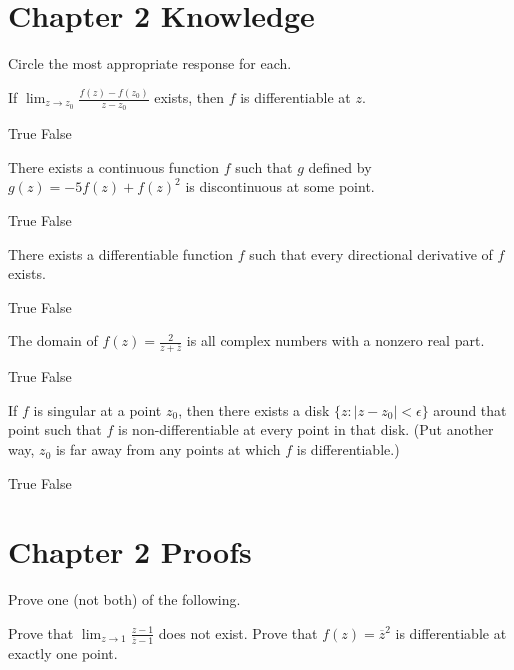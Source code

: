 \documentclass[13pt]{exam}
\begin{document}
\section*{Chapter 2 Knowledge}

Circle the most appropriate response for each.

\begin{questions}

\setcounter{question}{5}

\question If \(\lim_{z\to z_0}\frac{f(z)-f(z_0)}{z-z_0}\) exists,
then \(f\) is differentiable at \(z\). 
\begin{choices}
\choice True
\choice False
\end{choices}

\question There exists a continuous function \(f\) such that \(g\) defined by 
\(g(z)=-5f(z)+f(z)^2\) is discontinuous at some point. 
\begin{choices}
\choice True
\choice False
\end{choices}

\question There exists a differentiable function \(f\) such that
every directional derivative of \(f\) exists.
\begin{choices}
\choice True
\choice False
\end{choices}

\question The domain of \(f(z)=\frac{2}{z+\overline{z}}\) is all complex numbers
with a nonzero real part. 
\begin{choices}
\choice True
\choice False
\end{choices}

\question If \(f\) is singular at a point \(z_0\), then there exists a disk 
\(\{z:|z-z_0|<\epsilon\}\) around that point
such that \(f\) is non-differentiable at every point in that disk.
(Put another way, \(z_0\) is far away from any points at which \(f\) is
differentiable.) 
\begin{choices}
\choice True
\choice False
\end{choices}
\end{questions}

\section*{Chapter 2 Proofs}

Prove one (not both) of the following.

\begin{questions}

\setcounter{question}{10}

\question 
Prove that \(\lim_{z\to 1}\frac{z-1}{\overline{z}-1}\) does not exist.
\question 
Prove that \(f(z)=\overline{z}^2\) is differentiable at exactly one point.

\end{questions}
\end{document}
